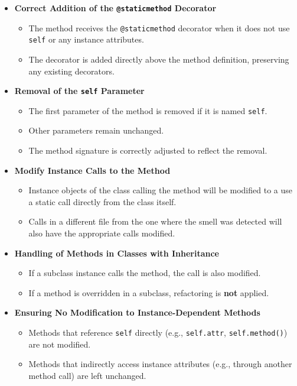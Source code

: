\documentclass[12pt, titlepage]{article}
\begin{document}
\begin{itemize}
    \item \textbf{Correct Addition of the \texttt{@staticmethod} Decorator}
    \begin{itemize}
        \item The method receives the \texttt{@staticmethod} decorator when it does not use \texttt{self} or any instance attributes.
        \item The decorator is added directly above the method definition, preserving any existing decorators.
    \end{itemize}

    \item \textbf{Removal of the \texttt{self} Parameter}
    \begin{itemize}
        \item The first parameter of the method is removed if it is named \texttt{self}.
        \item Other parameters remain unchanged.
        \item The method signature is correctly adjusted to reflect the removal.
    \end{itemize}

    \item \textbf{Modify Instance Calls to the Method}
    \begin{itemize}
        \item Instance objects of the class calling the method will be modified to a use a static call directly from the class itself.
        \item Calls in a different file from the one where the smell was detected will also have the appropriate calls modified.
    \end{itemize}

    \item \textbf{Handling of Methods in Classes with Inheritance}
    \begin{itemize}
        \item If a subclass instance calls the method, the call is also modified.
        \item If a method is overridden in a subclass, refactoring is \textbf{not} applied.
    \end{itemize}

    \item \textbf{Ensuring No Modification to Instance-Dependent Methods}
    \begin{itemize}
        \item Methods that reference \texttt{self} directly (e.g., \texttt{self.attr}, \texttt{self.method()}) are not modified.
        \item Methods that indirectly access instance attributes (e.g., through another method call) are left unchanged.
    \end{itemize}


\end{itemize}
\end{document}
